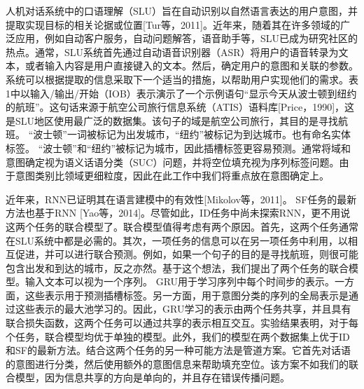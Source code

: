 人机对话系统中的口语理解（SLU）旨在自动识别以自然语言表达的用户意图，并提取实现目标的相关论据或位置[Tur等，2011]。近年来，随着其在许多领域的广泛应用，例如自动客户服务，自动问题解答，语音助手等，SLU已成为研究社区的热点。通常，SLU系统首先通过自动语音识别器（ASR）将用户的语音转录为文本，或者输入内容是用户直接键入的文本。然后，确定用户的意图和关联的参数。系统可以根据提取的信息采取下一个适当的措施，以帮助用户实现他们的需求。表1中以输入/输出/开始（IOB）表示演示了一个示例语句“显示今天从波士顿到纽约的航班”。这句话来源于航空公司旅行信息系统（ATIS）语料库[Price，1990]，这是SLU地区使用最广泛的数据集。该句子的域是航空公司旅行，其目的是寻找航班。 “波士顿”一词被标记为出发城市，“纽约”被标记为到达城市。也有命名实体标签。 “波士顿”和“纽约”被标记为城市，因此插槽标签更容易预测。通常将域和意图确定视为语义话语分类（SUC）问题，并将空位填充视为序列标签问题。由于意图类别比领域更细粒度，因此在此工作中我们将重点放在意图确定上。

近年来，RNN已证明其在语言建模中的有效性[Mikolov等，2011]。 SF任务的最新方法也基于RNN [Yao等，2014]。尽管如此，ID任务中尚未探索RNN，更不用说这两个任务的联合模型了。联合模型值得考虑有两个原因。首先，这两个任务通常在SLU系统中都是必需的。其次，一项任务的信息可以在另一项任务中利用，以相互促进，并可以进行联合预测。例如，如果一个句子的目的是寻找航班，则很可能包含出发和到达的城市，反之亦然。基于这个想法，我们提出了两个任务的联合模型。输入文本可以视为一个序列。 GRU用于学习序列中每个时间步的表示。一方面，这些表示用于预测插槽标签。另一方面，用于意图分类的序列的全局表示是通过这些表示的最大池学习的。因此，GRU学习的表示由两个任务共享，并且具有联合损失函数，这两个任务可以通过共享的表示相互交互。实验结果表明，对于每个任务，联合模型均优于单独的模型。此外，我们的模型在两个数据集上优于ID和SF的最新方法。结合这两个任务的另一种可能方法是管道方案。它首先对话语的意图进行分类，然后使用额外的意图信息来帮助填充空位。该方案不如我们的联合模型，因为信息共享的方向是单向的，并且存在错误传播问题。